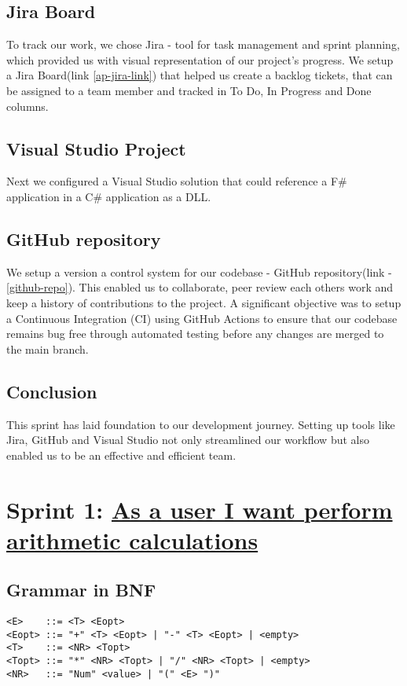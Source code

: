 \documentclass[a4paper, oneside, 11pt]{report}
\begin{document}
\subsection{Jira Board}
To track our work, we chose Jira\cite{Atlassian:JIRA} - tool for task management and sprint planning, which provided us with visual representation of our project's progress. We setup a Jira Board(link \ref{ap-jira-link}) that helped us create a backlog tickets, that can be assigned to a team member and tracked in To Do, In Progress and Done columns.

\subsection{Visual Studio Project}
Next we configured a Visual Studio solution that could reference a F\# application in a C\# application as a DLL\cite{DLL}.

\subsection{GitHub repository}
We setup a version a control system for our codebase - GitHub repository(link - \ref{github-repo}). This enabled us to collaborate, peer review each others work and keep a history of contributions to the project. A significant objective was to setup a Continuous Integration (CI)\cite{Atlassian:CI} using GitHub Actions\cite{GitHubDocs:Actions} to ensure that our codebase remains bug free through automated testing before any changes are merged to the main branch.

\subsection{Conclusion}
This sprint has laid foundation to our development journey. Setting up tools like Jira, GitHub and Visual Studio not only streamlined our workflow but also enabled us to be an effective and efficient team.

\section{Sprint 1: \href{https://liamfarese.atlassian.net/browse/AP-8}{As a user I want perform arithmetic calculations}}

\subsection{Grammar in BNF}
\begin{verbatim}
<E>    ::= <T> <Eopt>
<Eopt> ::= "+" <T> <Eopt> | "-" <T> <Eopt> | <empty>
<T>    ::= <NR> <Topt>
<Topt> ::= "*" <NR> <Topt> | "/" <NR> <Topt> | <empty>
<NR>   ::= "Num" <value> | "(" <E> ")"
\end{verbatim}
\end{document}
